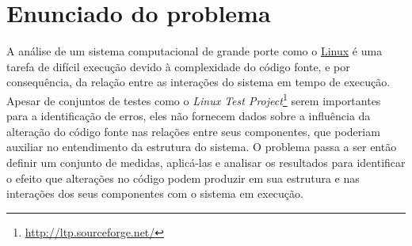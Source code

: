 \documentclass[a4paper,12pt,twoside]{article}
\def\linux{\href{http://www.kernel.org/}{\sc Linux}}
\begin{document}





\section{Enunciado do problema}


A análise de um sistema computacional de grande porte como o \linux{}
é uma tarefa de difícil execução devido à complexidade do código
fonte, e por consequência, da relação entre as interações do sistema
em tempo de execução. Apesar de conjuntos de testes como o
\textit{Linux Test
  Project}\footnote{\url{http://ltp.sourceforge.net/}} serem
importantes para a identificação de erros, eles não fornecem dados
sobre a influência da alteração do código fonte nas relações entre
seus componentes, que poderiam auxiliar no entendimento da estrutura
do sistema. O problema passa a ser então definir um conjunto de
medidas, aplicá-las e analisar os resultados para identificar o efeito
que alterações no código podem produzir em sua estrutura e nas
interações dos seus componentes com o sistema em execução.
\end{document}
